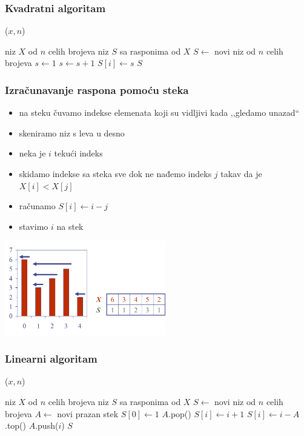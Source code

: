 \documentclass[compress,aspectratio=169]{beamer}
\begin{document}
\begin{frame}[fragile]
  \frametitle{Kvadratni algoritam}
($x, n$)
\begin{algorithmic}
\REQUIRE niz $X$ od $n$ celih brojeva
\ENSURE niz $S$ sa rasponima od $X$
\STATE $S \leftarrow$ novi niz od $n$ celih brojeva
  \STATE $s\leftarrow 1$
    \STATE $s\leftarrow s+1$
  \ENDWHILE
  \STATE $S[i]\leftarrow s$
  \RETURN $S$
\ENDFOR
\end{algorithmic}
\end{frame}

\begin{frame}[fragile]
  \frametitle{Izračunavanje raspona pomoću steka}
  \begin{itemize}
    \item na steku čuvamo indekse elemenata koji su vidljivi kada ,,gledamo unazad``
    \item skeniramo niz s leva u desno
    \item neka je $i$ tekući indeks
    \item skidamo indekse sa steka sve dok ne nađemo indeks $j$ takav da je $X[i]<X[j]$
    \item računamo $S[i]\leftarrow i-j$
    \item stavimo $i$ na stek
  \end{itemize}
  \begin{center}
    \includegraphics[width=7cm]{asp-05-pic06.png}
  \end{center}
\end{frame}

\begin{frame}[fragile,shrink=5]
  \frametitle{Linearni algoritam}
($x, n$)
\begin{algorithmic}
\REQUIRE niz $X$ od $n$ celih brojeva
\ENSURE niz $S$ sa rasponima od $X$
\STATE $S \leftarrow$ novi niz od $n$ celih brojeva
\STATE $A \leftarrow$ novi prazan stek
\STATE $S[0]\leftarrow 1$
    \STATE $A$.pop()
  \ENDWHILE
    \STATE $S[i]\leftarrow i+1$
  \ELSE
    \STATE $S[i]\leftarrow i-A$.top()
  \ENDIF
  \STATE $A$.push($i$)  
\ENDFOR
\RETURN $S$
\end{algorithmic}
\end{frame}
\end{document}
